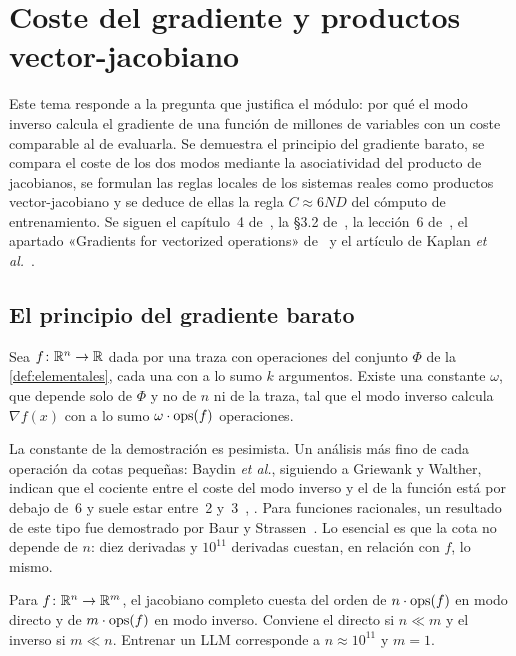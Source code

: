 \chapter{Coste del gradiente y productos vector-jacobiano}
\label{tema:4}

Este tema responde a la pregunta que justifica el módulo: por qué el modo inverso calcula el gradiente de una función de millones de variables con un coste comparable al de evaluarla. Se demuestra el principio del gradiente barato, se compara el coste de los dos modos mediante la asociatividad del producto de jacobianos, se formulan las reglas locales de los sistemas reales como productos vector-jacobiano y se deduce de ellas la regla $C\approx 6ND$ del cómputo de entrenamiento. Se siguen el capítulo~4 de~\cite{gw}, la §3.2 de~\cite{baydin}, la lección~6 de~\cite{grosse}, el apartado «Gradients for vectorized operations» de~\cite{cs231n} y el artículo de Kaplan \emph{et al.}~\cite{kaplan}.

\section{El principio del gradiente barato}

\begin{teorema}\label{teo:barato}
Sea $f\colon\mathbb{R}^{n}\to\mathbb{R}$ dada por una traza con operaciones del conjunto $\Phi$ de la \cref{def:elementales}, cada una con a lo sumo $k$ argumentos. Existe una constante $\omega$, que depende solo de $\Phi$ y no de $n$ ni de la traza, tal que el modo inverso calcula $\nabla f(x)$ con a lo sumo $\omega\cdot\operatorname{ops}(f)$ operaciones.
\end{teorema}

La constante de la demostración es pesimista. Un análisis más fino de cada operación da cotas pequeñas: Baydin \emph{et al.}, siguiendo a Griewank y Walther, indican que el cociente entre el coste del modo inverso y el de la función está por debajo de~6 y suele estar entre~2 y~3~\cite[§3.2]{baydin}, \cite[cap.~4]{gw}. Para funciones racionales, un resultado de este tipo fue demostrado por Baur y Strassen~\cite{baurstrassen}. Lo esencial es que la cota no depende de $n$: diez derivadas y $10^{11}$ derivadas cuestan, en relación con $f$, lo mismo.

\begin{corolario}\label{cor:eleccion}
Para $f\colon\mathbb{R}^{n}\to\mathbb{R}^{m}$, el jacobiano completo cuesta del orden de $n\cdot\operatorname{ops}(f)$ en modo directo y de $m\cdot\operatorname{ops}(f)$ en modo inverso. Conviene el directo si $n\ll m$ y el inverso si $m\ll n$. Entrenar un LLM corresponde a $n\approx 10^{11}$ y $m=1$.
\end{corolario}


